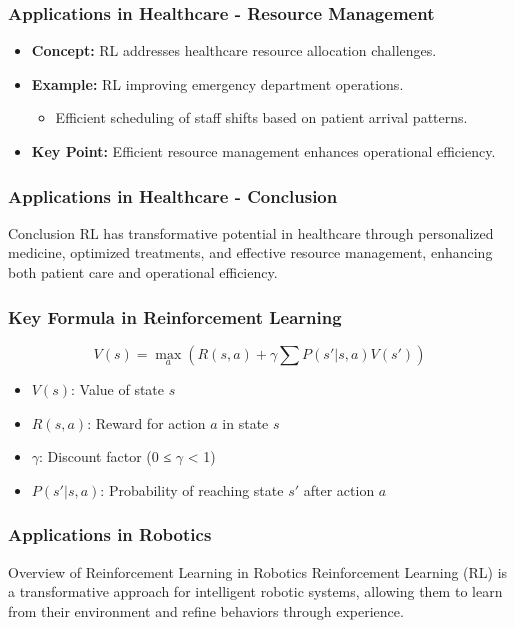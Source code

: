 \documentclass{beamer}
\begin{document}
\begin{frame}[fragile]
    \frametitle{Applications in Healthcare - Resource Management}
    \begin{itemize}
        \item \textbf{Concept:} RL addresses healthcare resource allocation challenges.
        \item \textbf{Example:} RL improving emergency department operations.
        \begin{itemize}
            \item Efficient scheduling of staff shifts based on patient arrival patterns.
        \end{itemize}
        \item \textbf{Key Point:} Efficient resource management enhances operational efficiency.
    \end{itemize}
\end{frame}

\begin{frame}[fragile]
    \frametitle{Applications in Healthcare - Conclusion}
    \begin{block}{Conclusion}
        RL has transformative potential in healthcare through personalized medicine, optimized treatments, and effective resource management, enhancing both patient care and operational efficiency.
    \end{block}
\end{frame}

\begin{frame}[fragile]
    \frametitle{Key Formula in Reinforcement Learning}
    \begin{equation}
        V(s) = \max_a \left( R(s, a) + \gamma \sum P(s'|s, a)V(s') \right)
    \end{equation}
    \begin{itemize}
        \item $V(s)$: Value of state $s$
        \item $R(s, a)$: Reward for action $a$ in state $s$
        \item $\gamma$: Discount factor (0 ≤ $\gamma$ < 1)
        \item $P(s'|s, a)$: Probability of reaching state $s'$ after action $a$
    \end{itemize}
\end{frame}

\begin{frame}[fragile]
    \frametitle{Applications in Robotics}
    \begin{block}{Overview of Reinforcement Learning in Robotics}
        Reinforcement Learning (RL) is a transformative approach for intelligent robotic systems, allowing them to learn from their environment and refine behaviors through experience.
    \end{block}
\end{frame}
\end{document}
